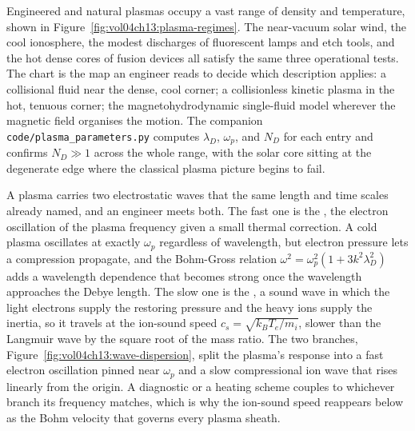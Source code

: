 Engineered and natural plasmas occupy a vast range of density and
temperature, shown in Figure~\ref{fig:vol04ch13:plasma-regimes}. The
near-vacuum solar wind, the cool ionosphere, the modest discharges of
fluorescent lamps and etch tools, and the hot dense cores of fusion
devices all satisfy the same three operational tests. The chart is the map
an engineer reads to decide which description applies: a collisional fluid
near the dense, cool corner; a collisionless kinetic plasma in the hot,
tenuous corner; the magnetohydrodynamic single-fluid model wherever the
magnetic field organises the motion. The companion
\texttt{code/plasma\_parameters.py} computes $\lambda_{D}$, $\omega_{p}$,
and $N_{D}$ for each entry and confirms $N_{D}\gg 1$ across the whole
range, with the solar core sitting at the degenerate edge where the
classical plasma picture begins to fail.

A plasma carries two electrostatic waves that the same length and time
scales already named, and an engineer meets both. The fast one is the
, the electron oscillation of the plasma frequency
given a small thermal correction. A cold plasma oscillates at exactly
$\omega_p$ regardless of wavelength, but electron pressure lets a
compression propagate, and the Bohm-Gross relation $\omega^{2} =
\omega_p^{2}(1 + 3k^{2}\lambda_D^{2})$ adds a wavelength dependence that
becomes strong once the wavelength approaches the Debye length. The slow one
is the , a sound wave in which the light electrons
supply the restoring pressure and the heavy ions supply the inertia, so it
travels at the ion-sound speed $c_s = \sqrt{k_B T_e/m_i}$, slower than the
Langmuir wave by the square root of the mass ratio. The two branches,
Figure~\ref{fig:vol04ch13:wave-dispersion}, split the plasma's response into a
fast electron oscillation pinned near $\omega_p$ and a slow compressional ion
wave that rises linearly from the origin. A diagnostic or a heating scheme
couples to whichever branch its frequency matches, which is why the ion-sound
speed reappears below as the Bohm velocity that governs every plasma sheath.



